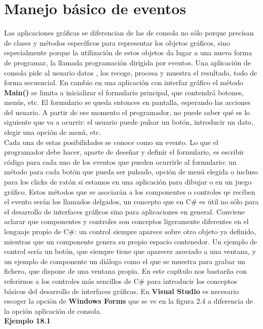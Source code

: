 \documentclass[12pt,a4paper]{report}
\begin{document}
\section{Manejo básico de eventos}
Las aplicaciones gráficas se diferencian de las de consola no sólo porque precisan de clases y métodos específicos para representar los objetos gráficos, sino especialmente porque la utilización de estos objetos da lugar a una nueva forma de programar, la llamada programación dirigida por eventos. Una aplicación de consola pide al usuario datos , los recoge, procesa y muestra el resultado, todo de forma secuencial. En cambio en una aplicación con interfaz gráfico el método \textbf{Main()} se limita a inicializar el formulario principal, que contendrá botones, menús, etc. El formulario se queda entonces en pantalla, esperando las acciones del usuario. A partir de ese momento el programador, no puede saber qué es lo siguiente que va a ocurrir: el usuario puede pulsar un botón, introducir un dato, elegir una opción de menú, etc.\\Cada una de estas posibilidades se conoce como un evento. Lo que el programador debe hacer, aparte de deseñar y definir el formulario, es escribir código para cada uno de los eventos que pueden ocurrirle al formulario: un método para cada botón que pueda ser pulsado, opción de menú elegida o incluso para los clicks de ratón si estamos en una aplicación para dibujar o en un juego gráfico. Estos métodos que se asociarán a los componentes o controles qe reciben el evento serán los llamados delgados, un concepto que en C\# es útil no sólo para el desarrollo de interfaces gráficos sino para aplicaciones en general. Conviene aclarar que componentes y controles son conceptos ligeramente diferentes en el lenguaje propio de C\#: un  control siempre aparece sobre otro objeto ya definido, mientras que un componente genera su propio espacio contenedor. Un ejemplo de control sería un botón, que siempre tiene que aparecer asociado a una ventana, y un ejemplo de componente un diálogo como el que se muestra para grabar un fichero, que dispone de una ventana propia. En este capítulo nos bastarña con referirnos a los controles más sencillos de C\# para introducir los conceptos básicos del desarrollo de interfaces gráficas. En\textbf{ Visual Studio} es necesario escoger la opción de \textbf{Windows Forms} que se ve en la figura 2.4 a diferencia de la opción aplicación de consola. \\\textbf{Ejemplo 18.1}
\end{document}
